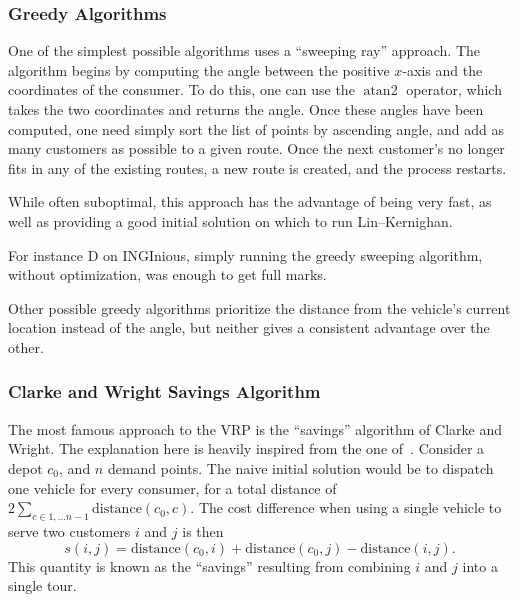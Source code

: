 \documentclass[journal]{IEEEtran}
\DeclareMathOperator{\atantwo}{atan2}
\begin{document}
\subsubsection{Greedy Algorithms}
One of the simplest possible algorithms uses a ``sweeping ray'' approach.
The algorithm begins by computing the angle between the positive \(x\)-axis and the coordinates of the consumer.
To do this, one can use the \(\atantwo\) operator, which takes the two coordinates and returns the angle.
Once these angles have been computed, one need simply sort the list of points by ascending angle, and add as many customers as possible to a given route.
Once the next customer's no longer fits in any of the existing routes, a new route is created, and the process restarts.

While often suboptimal, this approach has the advantage of being very fast, as well as providing a good initial solution on which to run Lin--Kernighan.

For instance D on INGInious, simply running the greedy sweeping algorithm, without optimization, was enough to get full marks.

Other possible greedy algorithms prioritize the distance from the vehicle's current location instead of the angle, but neither gives a consistent advantage over the other.

\subsubsection{Clarke and Wright Savings Algorithm}
The most famous approach to the VRP is the ``savings'' algorithm of Clarke and Wright.
The explanation here is heavily inspired from the one of~\cite{mitref}.
Consider a depot \(c_0\), and \(n\) demand points.
The naive initial solution would be to dispatch one vehicle for every consumer, for a total distance of \(2 \sum_{c \in 1, \ldots n-1} \mathrm{distance}(c_0, c)\).
The cost difference when using a single vehicle to serve two customers \(i\) and \(j\) is then
\[
s(i, j) = \mathrm{distance}(c_0, i) + \mathrm{distance}(c_0, j) - \mathrm{distance}(i, j).
\]
This quantity is known as the ``savings'' resulting from combining \(i\) and \(j\) into a single tour.
\end{document}
